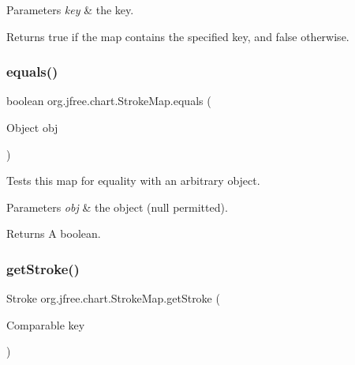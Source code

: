 \begin{DoxyParams}{Parameters}
{\em key} & the key.\\
\hline
\end{DoxyParams}
\begin{DoxyReturn}{Returns}
{\ttfamily true} if the map contains the specified key, and {\ttfamily false} otherwise. 
\end{DoxyReturn}
\mbox{\label{classorg_1_1jfree_1_1chart_1_1_stroke_map_a8ec059fe5a43e0fb9cd65f7bcfdf6add}} 
\subsubsection{\texorpdfstring{equals()}{equals()}}
{\footnotesize\ttfamily boolean org.\+jfree.\+chart.\+Stroke\+Map.\+equals (\begin{DoxyParamCaption}\item[{Object}]{obj }\end{DoxyParamCaption})}

Tests this map for equality with an arbitrary object.


\begin{DoxyParams}{Parameters}
{\em obj} & the object ({\ttfamily null} permitted).\\
\hline
\end{DoxyParams}
\begin{DoxyReturn}{Returns}
A boolean. 
\end{DoxyReturn}
\mbox{\label{classorg_1_1jfree_1_1chart_1_1_stroke_map_acf04326867255702582527490cb6d494}} 
\subsubsection{\texorpdfstring{get\+Stroke()}{getStroke()}}
{\footnotesize\ttfamily Stroke org.\+jfree.\+chart.\+Stroke\+Map.\+get\+Stroke (\begin{DoxyParamCaption}\item[{Comparable}]{key }\end{DoxyParamCaption})}

